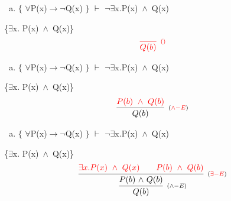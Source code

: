 \documentclass[aspectratio=43]{beamer}
\newcommand{\ria}{$\rightarrow$}
\newcommand{\fall}{$\forall$}
\newcommand{\ex}{$\exists$}
\newcommand{\nao}{$\neg$}
\newcommand{\nex}{\nao\ex}
\newcommand{\andd}{$\wedge$}
\begin{document}
    \begin{frame}[fragile]
    	
    	\begin{enumerate}[b)]
			
			\item $\{$ \fall P(x)\ria \nao Q(x) $\}$ $\vdash$ \nex  x.P(x)\ \andd\ Q(x) \\ 
			
		\end{enumerate}
        \{\ex  x. P(x)\ \andd\ Q(x)\}
        \vspace{100pt}
        \[
        \begin{array}{c}
		
        	\textcolor{red}{
            \infer[_{()}]
            {Q(b)}
            {}
            }
		\end{array}
        \]
        
	\end{frame}
    
    \begin{frame}[fragile]
    	
    	\begin{enumerate}[b)]
			
			\item $\{$ \fall P(x)\ria \nao Q(x) $\}$ $\vdash$ \nex  x.P(x)\ \andd\ Q(x) \\ 
			
		\end{enumerate}
        \{\ex  x. P(x)\ \andd\ Q(x)\}
        \vspace{95pt}
        \[
        \begin{array}{c}
		
        	\infer[_{(\textcolor{red}{\land-E})}]
            {Q(b)}
            {\textcolor{red}{P(b)\ \wedge \ Q(b)}}
		\end{array}
        \]
        
	\end{frame}
    
    \begin{frame}[fragile]
    	
    	\begin{enumerate}[b)]
			
			\item $\{$ \fall P(x)\ria \nao Q(x) $\}$ $\vdash$ \nex  x.P(x)\ \andd\ Q(x) \\ 
			
		\end{enumerate}
        \{\ex  x. P(x)\ \andd\ Q(x)\}
        \vspace{90pt}
        \[
        \begin{array}{c}
		
        	\infer[_{(\land-E)}]
            {Q(b)}
            {\infer[_{(\textcolor{red}{\exists-E})}]
                {P(b)\ $\andd$\ Q(b)}
            	{\textcolor{red}{\exists x.P(x)\ \wedge\ Q(x)} \hspace{20pt} \textcolor{red}{P(b)\ \wedge\ Q(b)}}
            }
		\end{array}
        \]
        
	\end{frame}
    
\end{document}

